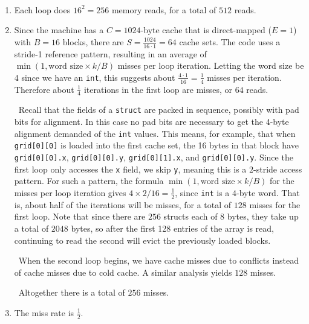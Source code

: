 \documentclass[12pt]{article}
\newenvironment{sol}[1][Solution]{\begin{trivlist}
		\item[\hskip \labelsep {\bfseries #1:}]}{\end{trivlist}}
\begin{document}
\begin{sol}
	\
	\begin{enumerate}[label=(\alph*)]
		\item Each loop does $16^2=256$ memory reads, for a total of $512$ reads.
		\item Since the machine has a $C=1024$-byte cache that is direct-mapped ($E=1$) with
		$B=16$ blocks, there are $S=\frac{1024}{16\cdot 1}=64$ cache sets.
		The code uses a stride-1 reference pattern, resulting in an average of
		$\min (1, \text{word size} \times k/B)$ misses per loop iteration. Letting
		the word size be 4 since we have an \texttt{int}, this suggests about
		$\frac{4\cdot 1}{16}=\frac{1}{4}$ misses per iteration. Therefore about
		$\frac{1}{4}$ iterations in the first loop are misses, or $64$ reads.
		
		\
		Recall that the fields of a \texttt{struct} are packed in sequence, possibly
		with pad bits for alignment. In this case no pad bits are necessary to get
		the 4-byte alignment demanded of the \texttt{int} values. This means, for
		example, that when \texttt{grid[0][0]} is loaded into the first cache set,
		the 16 bytes in that block have \texttt{grid[0][0].x}, \texttt{grid[0][0].y},
		\texttt{grid[0][1].x}, and \texttt{grid[0][0].y}. Since the first loop only
		accesses the \texttt{x} field, we skip \texttt{y}, meaning this is a $2$-stride
		access pattern. For such a pattern, the formula $\min (1, \text{word size} \times k/B)$
		for the misses per loop iteration gives $4\times 2/16=\frac{1}{2}$, since \texttt{int}
		is a $4$-byte word. That is, about half of the iterations will be misses, for
		a total of $128$ misses for the first loop. Note that since there are $256$
		structs each of 8 bytes, they take up a total of $2048$ bytes, so after the first
		128 entries of the array is read, continuing to read the second will evict the
		previously loaded blocks.
		
		\
		When the second loop begins, we have cache misses due to conflicts instead of
		cache misses due to cold cache. A similar analysis yields $128$ misses.
		
		\
		Altogether there is a total of $256$ misses.
		\item The miss rate is $\frac{1}{2}$.
	\end{enumerate}
\end{sol}
\end{document}

